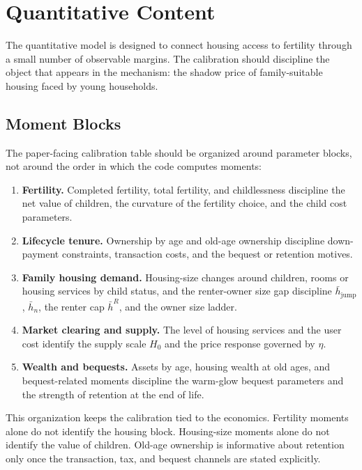 \documentclass[11pt]{article}
\begin{document}
\section{Quantitative Content}

The quantitative model is designed to connect housing access to fertility
through a small number of observable margins. The calibration should discipline
the object that appears in the mechanism: the shadow price of family-suitable
housing faced by young households.

\subsection{Moment Blocks}

The paper-facing calibration table should be organized around parameter blocks,
not around the order in which the code computes moments:
\begin{enumerate}[leftmargin=*]
    \item \textbf{Fertility.} Completed fertility, total fertility, and
    childlessness discipline the net value of children, the curvature of the
    fertility choice, and the child cost parameters.

    \item \textbf{Lifecycle tenure.} Ownership by age and old-age ownership
    discipline down-payment constraints, transaction costs, and the bequest or
    retention motives.

    \item \textbf{Family housing demand.} Housing-size changes around children,
    rooms or housing services by child status, and the renter-owner size gap
    discipline $\bar h_{\mathrm{jump}}$, $\bar h_n$, the renter cap $\bar h^R$,
    and the owner size ladder.

    \item \textbf{Market clearing and supply.} The level of housing services and
    the user cost identify the supply scale $H_0$ and the price response
    governed by $\eta$.

    \item \textbf{Wealth and bequests.} Assets by age, housing wealth at old
    ages, and bequest-related moments discipline the warm-glow bequest
    parameters and the strength of retention at the end of life.
\end{enumerate}

This organization keeps the calibration tied to the economics. Fertility
moments alone do not identify the housing block. Housing-size moments alone do
not identify the value of children. Old-age ownership is informative about
retention only once the transaction, tax, and bequest channels are stated
explicitly.
\end{document}
